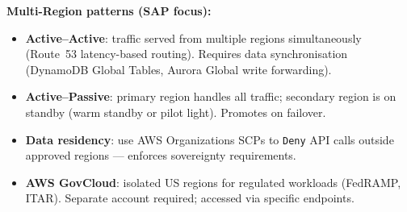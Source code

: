 \begin{sapdepth}
\textbf{Multi-Region patterns (SAP focus):}
\begin{itemize}
  \item \textbf{Active--Active}: traffic served from multiple regions simultaneously (Route~53
        latency-based routing). Requires data synchronisation (DynamoDB Global Tables,
        Aurora Global write forwarding).
  \item \textbf{Active--Passive}: primary region handles all traffic; secondary region is
        on standby (warm standby or pilot light). Promotes on failover.
  \item \textbf{Data residency}: use AWS Organizations SCPs to \texttt{Deny} API calls
        outside approved regions — enforces sovereignty requirements.
  \item \textbf{AWS GovCloud}: isolated US regions for regulated workloads (FedRAMP, ITAR).
        Separate account required; accessed via specific endpoints.
\end{itemize}
\end{sapdepth}
